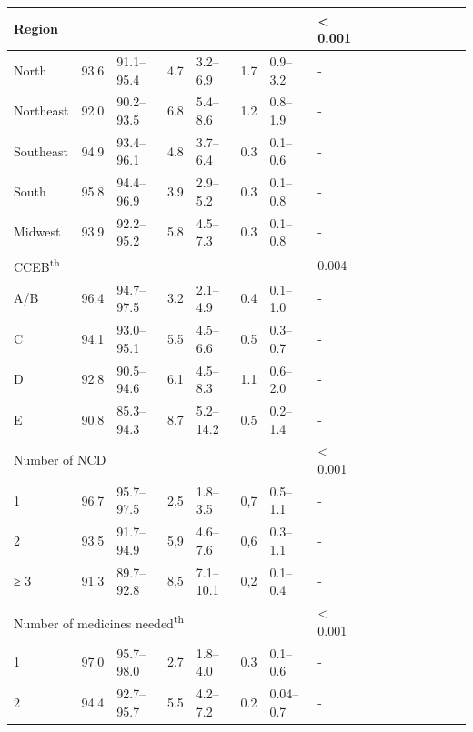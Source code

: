 \documentclass{article}
\begin{document}
\begin{tabular}{| l | l || || l | l | l | l | l || || l | l | l | l | l | l | l
| l | l |}
Region
& \multicolumn{6}{l}{}
& < 0.001
\\ \hline

North
& 93.6
& 91.1–95.4
& 4.7
& 3.2–6.9
& 1.7
& 0.9–3.2
& -
\\ \hline

Northeast
& 92.0
& 90.2–93.5
& 6.8
& 5.4–8.6
& 1.2
& 0.8–1.9
& -
\\ \hline

Southeast
& 94.9
& 93.4–96.1
& 4.8
& 3.7–6.4
& 0.3
& 0.1–0.6
& -
\\ \hline

South
& 95.8
& 94.4–96.9
& 3.9
& 2.9–5.2
& 0.3
& 0.1–0.8
& -
\\ \hline

Midwest
& 93.9
& 92.2–95.2
& 5.8
& 4.5–7.3
& 0.3
& 0.1–0.8
& -
\\ \hline

\multicolumn{7}{l}{CCEB\textsuperscript{th}
}
& 0.004
\\ \hline

A/B
& 96.4
& 94.7–97.5
& 3.2
& 2.1–4.9
& 0.4
& 0.1–1.0
& -
\\ \hline

C
& 94.1
& 93.0–95.1
& 5.5
& 4.5–6.6
& 0.5
& 0.3–0.7
& -
\\ \hline

D
& 92.8
& 90.5–94.6
& 6.1
& 4.5–8.3
& 1.1
& 0.6–2.0
& -
\\ \hline

E
& 90.8
& 85.3–94.3
& 8.7
& 5.2–14.2
& 0.5
& 0.2–1.4
& -
\\ \hline

\multicolumn{7}{l}{Number of NCD}
& < 0.001
\\ \hline

1
& 96.7
& 95.7–97.5
& 2,5
& 1.8–3.5
& 0,7
& 0.5–1.1
& -
\\ \hline

2
& 93.5
& 91.7–94.9
& 5,9
& 4.6–7.6
& 0,6
& 0.3–1.1
& -
\\ \hline

≥ 3
& 91.3
& 89.7–92.8
& 8,5
& 7.1–10.1
& 0,2
& 0.1–0.4
& -
\\ \hline

\multicolumn{7}{l}{Number of medicines needed\textsuperscript{th}
}
& < 0.001
\\ \hline

1
& 97.0
& 95.7–98.0
& 2.7
& 1.8–4.0
& 0.3
& 0.1–0.6
& -
\\ \hline

2
& 94.4
& 92.7–95.7
& 5.5
& 4.2–7.2
& 0.2
& 0.04–0.7
& -
\\ \hline


\end{tabular}
\end{document}
